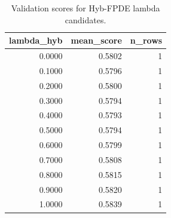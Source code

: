 \begin{table}[t]
\caption{Validation scores for Hyb-FPDE lambda candidates.}
\label{tab:lambda_distribution_computed}
\centering
\begin{tabular}{rrr}
\toprule
lambda\_hyb & mean\_score & n\_rows \\
\midrule
0.0000 & 0.5802 & 1 \\
0.1000 & 0.5796 & 1 \\
0.2000 & 0.5800 & 1 \\
0.3000 & 0.5794 & 1 \\
0.4000 & 0.5793 & 1 \\
0.5000 & 0.5794 & 1 \\
0.6000 & 0.5799 & 1 \\
0.7000 & 0.5808 & 1 \\
0.8000 & 0.5815 & 1 \\
0.9000 & 0.5820 & 1 \\
1.0000 & 0.5839 & 1 \\
\bottomrule
\end{tabular}

\end{table}
